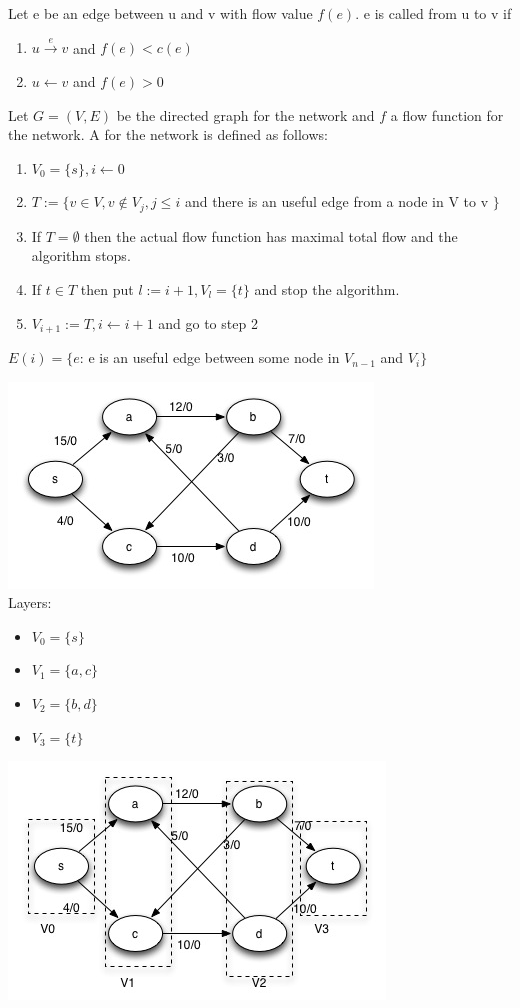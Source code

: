 \begin{definition}
Let e be an edge between u and v with flow value $f(e)$. e is called  from u to v if 
\begin{enumerate}
\item $ u \xrightarrow{e} v$ and $f(e) < c(e)$
\item $u \leftarrow v$ and $f(e) > 0 $
\end{enumerate}
Let $G = (V,E)$ be the directed graph for the network and $f$ a flow function for the network. A  for the network is defined as follows: 
\begin{enumerate}
\item $V_0 = \{s\}, i \leftarrow 0$
\item $ T := \{ v \in V, v \notin V_j, j \le i$ and there is an useful edge from a node in V to v $\}$
\item If $ T = \emptyset$ then the actual flow function has maximal total flow and the algorithm stops. 
\item If $t \in T$ then put $l := i+1, V_l = \{t\}$ and stop the algorithm.
\item $V_{i+1} := T, i \leftarrow i+1$ and go to step 2
\end{enumerate}
$E(i) = \{e$: e is an useful edge between some node in $V_{n-1}$ and $V_i \}$
\end{definition}

\begin{example}
\includegraphics{diagrams/Chapter3_Example5.jpg} \\
Layers:
\begin{itemize}
\item $V_0 = \{s\}$
\item $V_1 = \{a, c \}$
\item $V_2 = \{b, d \}$
\item $V_3 = \{t \}$
\end{itemize}
\includegraphics{diagrams/Chapter3_Example5_Solution.jpg} \\
\end{example}

